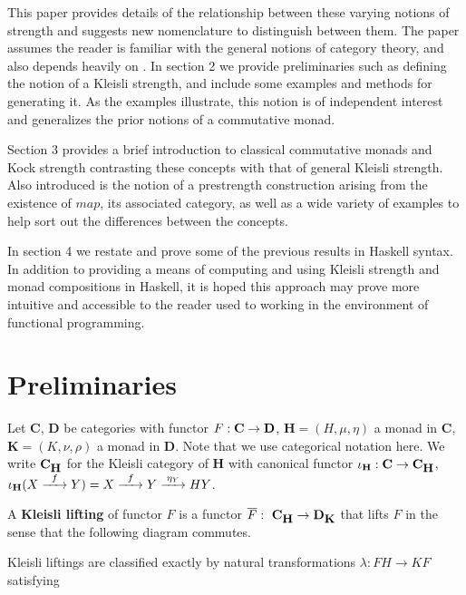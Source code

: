 \documentclass[submission,copyright]{eptcs}
\begin{document}
This paper provides details of the relationship between these varying notions of strength and suggests new nomenclature to distinguish between them. The paper assumes the reader is familiar with the general notions of category theory, and also depends heavily on \cite{articleD}. In section 2 we provide preliminaries such as defining the notion of a Kleisli strength, and include some examples and methods for generating it. As the examples illustrate, this notion is of independent interest and generalizes the prior notions of a commutative monad. 

Section 3 provides a brief introduction to classical commutative monads and Kock strength contrasting these concepts with that of general Kleisli strength. Also introduced is the notion of a prestrength construction arising from the existence of $map$, its associated category, as well as a wide variety of examples to help sort out the differences between the concepts.

In section 4 we restate and prove some of the previous results in Haskell syntax. In addition to providing a means of computing and using Kleisli strength and monad compositions in Haskell, it is hoped this approach may prove more intuitive and accessible to the reader used to working in the environment of functional programming.


\section{Preliminaries}
Let \textbf{C}, \textbf{D} be categories with functor $F: {\bf C} \rightarrow {\bf D}$,
$\mathbf{H} = (H, \mu, \eta)$ a monad in \textbf{C}, $\mathbf{K} = (K, \nu, \rho)$ a monad in \textbf{D}.  Note that we use categorical notation here.  We write $\mathbf{C}_{\mbox{\small \textbf{H}}}$ for the Kleisli category of \textbf{H} with canonical functor  $\iota_\mathbf{H} : \mathbf{C} \rightarrow \mathbf{C}_{\mbox{\small \textbf{H}}}$, $\iota_\mathbf{H} (X \ssr{f} Y) = X \ssr{f} Y \ssr{\eta_Y} HY$.  

A \textbf{Kleisli lifting} of functor $F$ is a functor $\overline{F}:~\mathbf{C}_{\mbox{\small \textbf{H}}} \rightarrow \mathbf{D}_{\mbox{\small \textbf{K}}}$ that lifts $F$ in the sense that the following diagram commutes.
\begin{center}
\setsqparms[1`-1`-1`1;500`500]
\end{center} 

Kleisli liftings are classified exactly by natural transformations $\lambda : FH \rightarrow KF$ satisfying 
\end{document}

